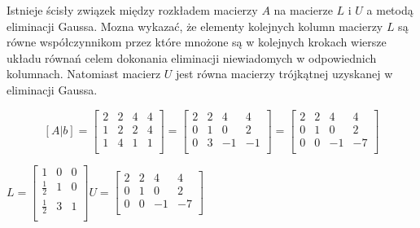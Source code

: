 \documentclass[a4paper,11pt]{article}
\begin{document}
    Istnieje ścisły związek między rozkładem macierzy \(A\) na macierze \(L\) i \(U\) a metodą eliminacji Gaussa.
    Mozna wykazać, że elementy kolejnych kolumn macierzy \(L\) są równe współczynnikom przez które mnożone
    są w kolejnych krokach wiersze układu równań celem dokonania eliminacji niewiadomych w odpowiednich
    kolumnach. Natomiast macierz \(U\) jest równa macierzy trójkątnej uzyskanej w eliminacji Gaussa.

    \[
        [A|b] =
        \begin{bmatrix}
            2 & 2 & 4 & 4 \\
            1 & 2 & 2 & 4 \\
            1 & 4 & 1 & 1 \\
        \end{bmatrix} =
        \begin{bmatrix}
            2 & 2 & 4 & 4 \\
            0 & 1 & 0 & 2 \\
            0 & 3 & -1 & -1 \\
        \end{bmatrix} =
        \begin{bmatrix}
            2 & 2 & 4 & 4 \\
            0 & 1 & 0 & 2 \\
            0 & 0 & -1 & -7 \\
        \end{bmatrix}
    \]
    \begin{sloppypar}
    \centerline{
        ${
            L = \begin{bmatrix}
                1 & 0 & 0 \\
                \frac{1}{2} & 1 & 0 \\
                \frac{1}{2} & 3 & 1 \\
            \end{bmatrix}
            U = \begin{bmatrix}
                2 & 2 & 4 & 4 \\
                0 & 1 & 0 & 2 \\
                0 & 0 & -1 & -7 \\
            \end{bmatrix}
        }$
    }
    \end{sloppypar}
\end{document}
